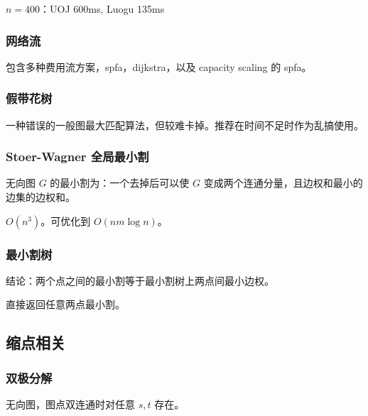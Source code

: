 \documentclass[12pt]{ctexart}
\begin{document}
$n=400$：UOJ 600ms, Luogu 135ms



\subsubsection{网络流}


包含多种费用流方案，spfa，dijkstra，以及 capacity scaling 的 spfa。




\subsubsection{假带花树}

一种错误的一般图最大匹配算法，但较难卡掉。推荐在时间不足时作为乱搞使用。



\subsubsection{Stoer-Wagner 全局最小割}

无向图 $G$ 的最小割为：一个去掉后可以使 $G$ 变成两个连通分量，且边权和最小的边集的边权和。

$O(n^3)$。可优化到 $O(nm\log n)$。



\subsubsection{最小割树}

结论：两个点之间的最小割等于最小割树上两点间最小边权。

直接返回任意两点最小割。



\subsection{缩点相关}

\subsubsection{双极分解}

无向图，图点双连通时对任意 $s,t$ 存在。
\end{document}
